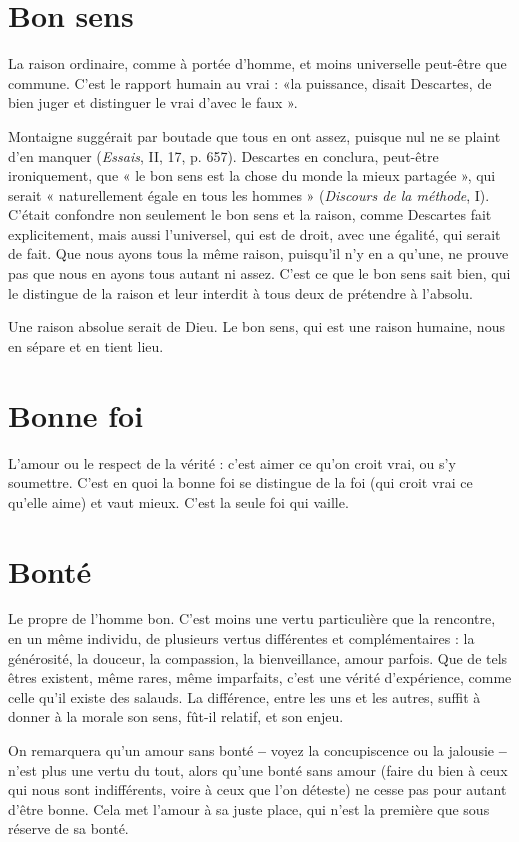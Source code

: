 \section{Bon sens}
La raison ordinaire, comme à portée d’homme, et moins universelle
peut-être que commune. C’est le rapport humain au vrai :
«la puissance, disait Descartes, de bien juger et distinguer le vrai d’avec le
faux ».

Montaigne suggérait par boutade que tous en ont assez, puisque nul ne se
plaint d'en manquer ({\it Essais}, II, 17, p. 657). Descartes en conclura, peut-être
ironiquement, que « le bon sens est la chose du monde la mieux partagée », qui
serait « naturellement égale en tous les hommes » ({\it Discours de la méthode}, I).
C'était confondre non seulement le bon sens et la raison, comme Descartes fait
explicitement, mais aussi l’universel, qui est de droit, avec une égalité, qui serait
de fait. Que nous ayons tous la même raison, puisqu'il n’y en a qu’une, ne
prouve pas que nous en ayons tous autant ni assez. C’est ce que le bon sens sait
bien, qui le distingue de la raison et leur interdit à tous deux de prétendre à
l'absolu.

Une raison absolue serait de Dieu. Le bon sens, qui est une raison
humaine, nous en sépare et en tient lieu.

\section{Bonne foi}
L’amour ou le respect de la vérité : c’est aimer ce qu’on croit
vrai, ou s’y soumettre. C’est en quoi la bonne foi se distingue
de la foi (qui croit vrai ce qu’elle aime) et vaut mieux. C’est la seule foi qui
vaille.

\section{Bonté}
Le propre de l’homme bon. C’est moins une vertu particulière que
la rencontre, en un même individu, de plusieurs vertus différentes
et complémentaires : la générosité, la douceur, la compassion, la bienveillance,
amour parfois. Que de tels êtres existent, même rares, même imparfaits,
c’est une vérité d'expérience, comme celle qu’il existe des salauds. La différence,
entre les uns et les autres, suffit à donner à la morale son sens, fût-il relatif, et
son enjeu.

On remarquera qu’un amour sans bonté {\bf --} voyez la concupiscence ou la
jalousie {\bf --} n’est plus une vertu du tout, alors qu’une bonté sans amour (faire du
bien à ceux qui nous sont indifférents, voire à ceux que l’on déteste) ne cesse
pas pour autant d’être bonne. Cela met l’amour à sa juste place, qui n’est la
première que sous réserve de sa bonté.

